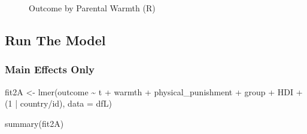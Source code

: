 \documentclass[
  letterpaper,
  DIV=11,
  numbers=noendperiod]{scrreprt}
\newenvironment{Shaded}{\begin{snugshade}}{\end{snugshade}}
\newcommand{\AttributeTok}[1]{\textcolor[rgb]{0.40,0.45,0.13}{#1}}
\newcommand{\DecValTok}[1]{\textcolor[rgb]{0.68,0.00,0.00}{#1}}
\newcommand{\FunctionTok}[1]{\textcolor[rgb]{0.28,0.35,0.67}{#1}}
\newcommand{\NormalTok}[1]{\textcolor[rgb]{0.00,0.23,0.31}{#1}}
\newcommand{\OtherTok}[1]{\textcolor[rgb]{0.00,0.23,0.31}{#1}}
\newcommand{\SpecialCharTok}[1]{\textcolor[rgb]{0.37,0.37,0.37}{#1}}
\begin{document}
\begin{figure}[H]


\caption{\label{fig-Rlongitudinal}Outcome by Parental Warmth (R)}

\end{figure}%

\subsection{Run The Model}\label{run-the-model-4}

\subsubsection{Main Effects Only}\label{main-effects-only-1}

\begin{Shaded}
\begin{Highlighting}[]
\NormalTok{fit2A }\OtherTok{\textless{}{-}} \FunctionTok{lmer}\NormalTok{(outcome }\SpecialCharTok{\textasciitilde{}}\NormalTok{ t }\SpecialCharTok{+}\NormalTok{ warmth }\SpecialCharTok{+}\NormalTok{ physical\_punishment }\SpecialCharTok{+} 
\NormalTok{               group }\SpecialCharTok{+}\NormalTok{ HDI }\SpecialCharTok{+}
\NormalTok{               (}\DecValTok{1} \SpecialCharTok{|}\NormalTok{ country}\SpecialCharTok{/}\NormalTok{id),}
             \AttributeTok{data =}\NormalTok{ dfL)}

\FunctionTok{summary}\NormalTok{(fit2A)}
\end{Highlighting}
\end{Shaded}
\end{document}
